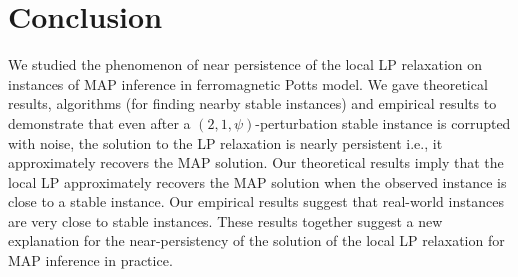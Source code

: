 \section{Conclusion}

We studied the phenomenon of near persistence of the local LP relaxation on instances of MAP inference in ferromagnetic Potts model. We gave theoretical results, algorithms (for finding nearby stable instances) and empirical results to demonstrate that even after a $(2,1,\psi)$-perturbation stable instance is corrupted with noise, the solution to the LP relaxation is nearly persistent i.e., it approximately recovers the MAP solution.  Our theoretical results imply that the local LP approximately recovers the MAP solution when the observed instance is close to a stable instance. Our empirical results suggest that real-world instances are very close to stable instances. These results together suggest a new explanation for the near-persistency of the solution of the local LP relaxation for MAP inference in practice.

